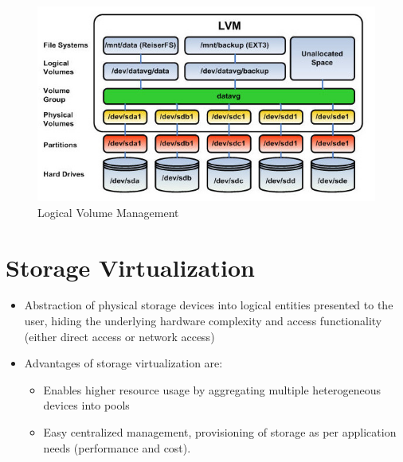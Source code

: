 \documentclass{article}
\begin{document}
\begin{figure}[!ht]
    \centering
    \includegraphics[scale=0.7]{LogicalVolumenManager.jpg}
    \caption{Logical Volume Management}
    \label{fig:my_label}
\end{figure}

\section{Storage Virtualization}
\begin{itemize}
    \item Abstraction of physical storage devices into logical entities presented to the user, hiding the underlying hardware complexity and access functionality (either direct access or network access)
    
    \item Advantages of storage virtualization are:
    \begin{itemize}
        \item Enables higher resource usage by aggregating multiple heterogeneous devices into pools
        
        \item Easy centralized management, provisioning of storage as per application needs (performance and cost).  
    \end{itemize}
\end{itemize}
\end{document}
